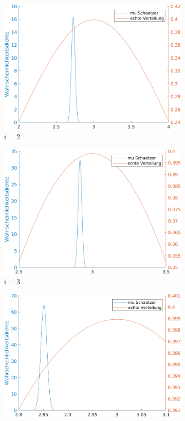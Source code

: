 \documentclass[a4paper]{scrartcl}
\begin{document}
\begin{figure}[H]
\begin{subfigure}{.5\textwidth}
		\includegraphics*[scale = 0.4]{assignment3_data/plots/q3_i2}
		\caption*{i = 2}
	\end{subfigure}%
	\begin{subfigure}{.5\textwidth}
		\centering
		\includegraphics*[scale = 0.4]{assignment3_data/plots/q3_i3}
		\caption*{i = 3}
	\end{subfigure}
	\begin{subfigure}{.5\textwidth}
		\centering
		\includegraphics*[scale = 0.4]{assignment3_data/plots/q3_i4}

\end{subfigure}
\end{figure}
\end{document}
